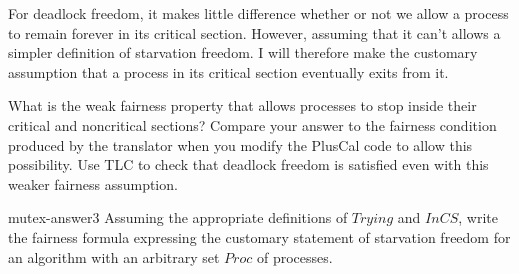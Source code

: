 \documentclass[fleqn,leqno]{article}
\begin{document}
For deadlock freedom, it makes little difference whether or not we
allow a process to remain forever in its critical section.  However,
assuming that it can't allows a simpler definition of
starvation freedom.  I will therefore make the customary assumption
that a process in its critical section eventually exits from it.
\begin{question}
What is the weak fairness property that allows processes to stop
inside their critical and noncritical sections?  Compare your answer
to the fairness condition produced by the translator when you modify
the PlusCal code to allow this possibility.  Use TLC to check
that deadlock freedom is satisfied even with this weaker fairness
assumption.
\end{question}
\begin{aquestion}{mutex-answer3} 
%
Assuming the appropriate definitions of $Trying$ and $InCS$, write
the fairness formula expressing the customary statement of starvation
freedom for an algorithm with an arbitrary set $Proc$ of processes.

\end{aquestion}

%
\end{document}
